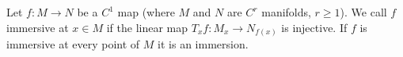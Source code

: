 Let $f: M \to N$ be a $C^1$ map (where $M$ and $N$ are $C^r$ manifolds, $r \geqslant 1$). We call $f$ immersive at $x \in M$ if the linear map $T_x f: M_x \to N_{f(x)}$ is injective. If $f$ is immersive at every point of $M$ it is an immersion.
